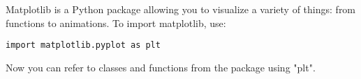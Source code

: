 Matplotlib is a Python package allowing you to visualize a variety of things: from functions to animations. To import matplotlib, use:
\begin{lstlisting}
import matplotlib.pyplot as plt
\end{lstlisting}

Now you can refer to classes and functions from the package using "plt".